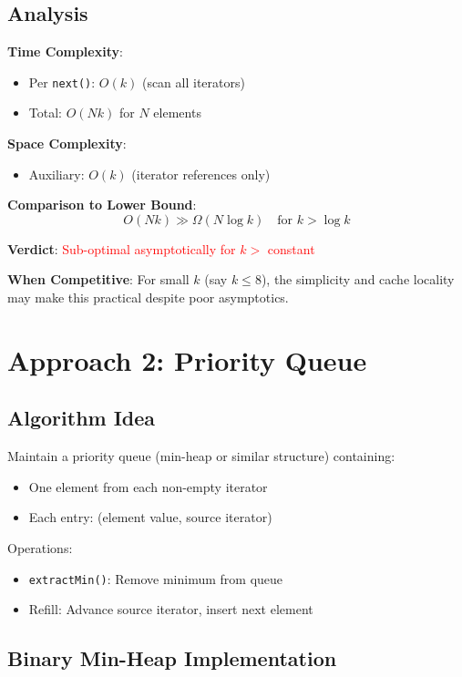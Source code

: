 \documentclass[11pt]{article}
\begin{document}
\subsection{Analysis}

\textbf{Time Complexity}:
\begin{itemize}
    \item Per \texttt{next()}: $O(k)$ (scan all iterators)
    \item Total: $O(Nk)$ for $N$ elements
\end{itemize}

\textbf{Space Complexity}:
\begin{itemize}
    \item Auxiliary: $O(k)$ (iterator references only)
\end{itemize}

\textbf{Comparison to Lower Bound}:
\[
O(Nk) \gg \Omega(N \log k) \quad \text{for } k > \log k
\]

\textbf{Verdict}: \textcolor{red}{Sub-optimal asymptotically for $k > $ constant}

\textbf{When Competitive}: For small $k$ (say $k \leq 8$), the simplicity and cache locality may make this practical despite poor asymptotics.

\section{Approach 2: Priority Queue}

\subsection{Algorithm Idea}

Maintain a priority queue (min-heap or similar structure) containing:
\begin{itemize}
    \item One element from each non-empty iterator
    \item Each entry: (element value, source iterator)
\end{itemize}

Operations:
\begin{itemize}
    \item \texttt{extractMin()}: Remove minimum from queue
    \item Refill: Advance source iterator, insert next element
\end{itemize}

\subsection{Binary Min-Heap Implementation}
\end{document}
